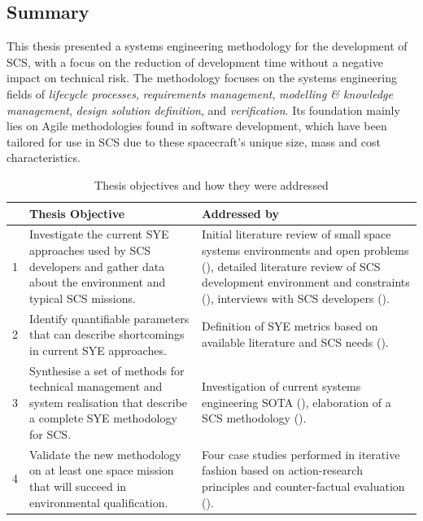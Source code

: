 \documentclass[a4paper,nobib,justified,final]{tufte-book}
\begin{document}
\begin{fullwidth}

\section{Summary}

This thesis presented a systems engineering methodology for the development of \acf{SCS}, with a focus on the reduction of development time without a negative impact on technical risk.
The methodology focuses on the systems engineering fields of \emph{lifecycle processes}, \emph{requirements management}, \emph{modelling \& knowledge management}, \emph{design solution definition}, and \emph{verification}. Its foundation mainly lies on Agile methodologies found in software development, which have been tailored for use in \acl{SCS} due to these spacecraft's unique size, mass and cost characteristics.

\begin{table}[h]
\def\arraystretch{1.2}
\begin{tabularx}{\textwidth}{lXX}
	\toprule
	& \textbf{Thesis Objective} & \textbf{Addressed by} \\
	\midrule
	1 & Investigate the current \ac{SYE} approaches used by \ac{SCS} developers and gather data about the environment and typical \ac{SCS} missions. & Initial literature review of small space systems environments and open problems (\Cref{sec:INTRODUCTION_defining_systems_engineering,sec:INTRODUCTION_research_gaps}), detailed literature review of \acs{SCS} development environment and constraints (\Cref{sec:LITERATURE_subcubesat}), interviews with \acs{SCS} developers (\Cref{sec:LITERATURE_interviews}). \\
	2 & Identify quantifiable parameters that can describe shortcomings in current \ac{SYE} approaches. & Definition of \acs{SYE} metrics based on available literature and \acs{SCS} needs (\Cref{sec:LITERATURE_metrics}). \\
	3 & Synthesise a set of methods for technical management and system realisation that describe a complete \ac{SYE} methodology for \ac{SCS}. & Investigation of current systems engineering \acs{SOTA} (\Cref{sec:LITERATURE_systems_engineering}), elaboration of a \acs{SCS} methodology (\Cref{chap:METHODOLOGY}). \\
	4 & Validate the new methodology on at least one space mission that will succeed in environmental qualification. & Four case studies performed in iterative fashion based on action-research principles and counter-factual evaluation (\Cref{chap:CASESTUDIES}). \\
	\bottomrule
\end{tabularx}
\caption{Thesis objectives and how they were addressed}
\end{table}


\end{fullwidth}
\end{document}
